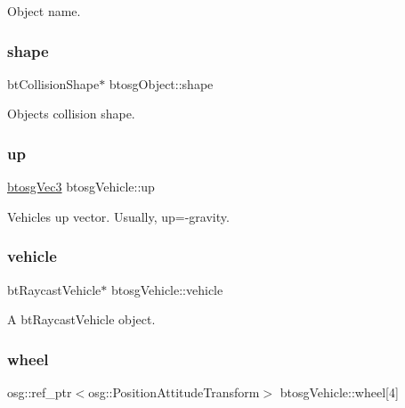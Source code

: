 Object name. 

\mbox{\label{classbtosgObject_a0f6a8da01cf643c321bffe86e42604b0}} 
\subsubsection{\texorpdfstring{shape}{shape}}
{\footnotesize\ttfamily bt\+Collision\+Shape$\ast$ btosg\+Object\+::shape\hspace{0.3cm}{\ttfamily [inherited]}}



Object\textquotesingle{}s collision shape. 

\mbox{\label{classbtosgVehicle_a84705afaa9e37bb8a0bd7f6b6f291c26}} 
\subsubsection{\texorpdfstring{up}{up}}
{\footnotesize\ttfamily \mbox{\hyperlink{classbtosgVec3}{btosg\+Vec3}} btosg\+Vehicle\+::up}



Vehicle\textquotesingle{}s up vector. Usually, up=-\/gravity. 

\mbox{\label{classbtosgVehicle_ac45b117f8b523f7040de99639deb7522}} 
\subsubsection{\texorpdfstring{vehicle}{vehicle}}
{\footnotesize\ttfamily bt\+Raycast\+Vehicle$\ast$ btosg\+Vehicle\+::vehicle}



A bt\+Raycast\+Vehicle object. 

\mbox{\label{classbtosgVehicle_a37edb4c28551037829ffd79c7bc315ba}} 
\subsubsection{\texorpdfstring{wheel}{wheel}}
{\footnotesize\ttfamily osg\+::ref\+\_\+ptr$<$osg\+::\+Position\+Attitude\+Transform$>$ btosg\+Vehicle\+::wheel\mbox{[}4\mbox{]}}



